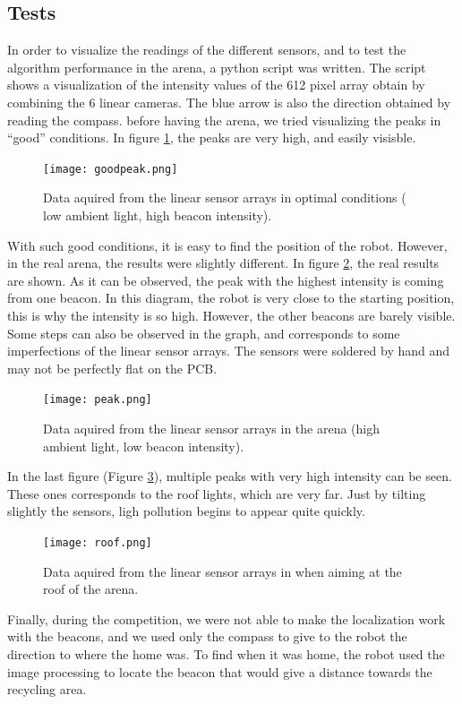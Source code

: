 \subsection{Tests}

In order to visualize the readings of the different sensors, and to test the algorithm performance in the arena, a python script was written. The script shows a visualization of the intensity values of the 612 pixel array obtain by combining the 6 linear cameras. The blue arrow is also the direction obtained by reading the compass.
 before having the arena, we tried visualizing the peaks in ``good'' conditions. In figure \ref{fig:goodpeak}, the peaks are very high, and easily visisble. 

\begin{figure}[H]
\centering
\texttt{[image: goodpeak.png]}
\caption{Data aquired from the linear sensor arrays in optimal conditions ( low ambient light, high beacon intensity).}
\label{fig:goodpeak}
\end{figure}

With such good conditions, it is easy to find the position of the robot. However, in the real arena, the results were slightly different. In figure \ref{fig:peak}, the real results are shown. As it can be observed, the peak with the highest intensity is coming from one beacon. In this diagram, the robot is very close to the starting position, this is why the intensity is so high. However, the other beacons are barely visible. Some steps can also be observed in the graph, and corresponds to some imperfections of the linear sensor arrays. The sensors were soldered by hand and may not be perfectly flat on the PCB.

\begin{figure}[H]
\centering
\texttt{[image: peak.png]}
\caption{Data aquired from the linear sensor arrays in the arena (high ambient light, low beacon intensity).}
\label{fig:peak}
\end{figure}

In the last figure (Figure \ref{fig:roof}), multiple peaks with very high intensity can be seen. These ones corresponds to the roof lights, which are very far. Just by tilting slightly the sensors, ligh pollution begins to appear quite quickly.

\begin{figure}[H]
\centering
\texttt{[image: roof.png]}
\caption{Data aquired from the linear sensor arrays in when aiming at the roof of the arena.}
\label{fig:roof}
\end{figure}

Finally, during the competition, we were not able to make the localization work with the beacons, and we used only the compass to give to the robot the direction to where the home was. To find when it was home, the robot used the image processing to locate the beacon that would give a distance towards the recycling area.